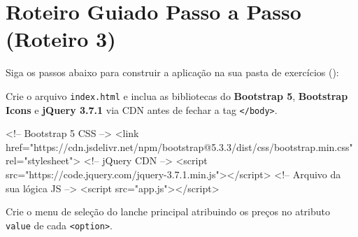 \section{Roteiro Guiado Passo a Passo (Roteiro 3)}\label{sec:m3a}

Siga os passos abaixo para construir a aplicação na sua pasta de exercícios ():

\begin{boxAtividade}
Crie o arquivo \texttt{index.html} e inclua as bibliotecas do \textbf{Bootstrap 5}, \textbf{Bootstrap Icons} e \textbf{jQuery 3.7.1} via CDN antes de fechar a tag \texttt{</body>}.

\begin{boxCodigoHTML}
<!-- Bootstrap 5 CSS -->
<link href="https://cdn.jsdelivr.net/npm/bootstrap@5.3.3/dist/css/bootstrap.min.css" 
      rel="stylesheet">
<!-- jQuery CDN -->
<script src="https://code.jquery.com/jquery-3.7.1.min.js"></script>
<!-- Arquivo da sua lógica JS -->
<script src="app.js"></script>
\end{boxCodigoHTML}
\end{boxAtividade}

\begin{boxAtividade}
Crie o menu de seleção do lanche principal atribuindo os preços no atributo \texttt{value} de cada \texttt{<option>}.

\end{boxAtividade}


